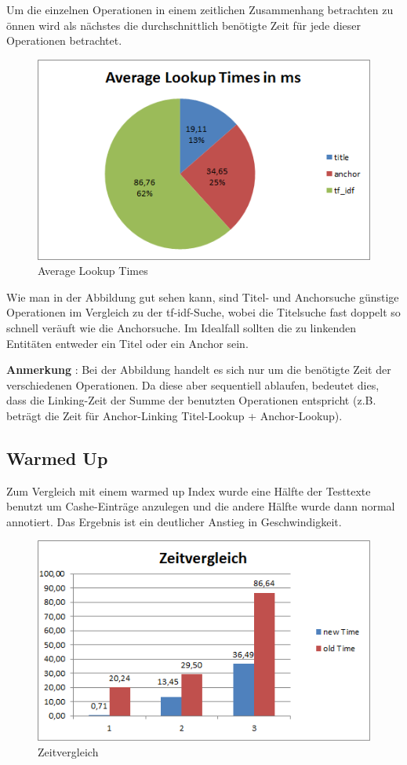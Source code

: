 \documentclass[11pt, a4paper, oneside]{Thesis} %
\begin{document}
Um die einzelnen Operationen in einem zeitlichen Zusammenhang betrachten zu \"onnen wird als n\"achstes die durchschnittlich ben\"otigte Zeit f\"ur jede dieser Operationen betrachtet. 
\begin{figure}[ht!]
\centering
\includegraphics[scale=1]{./lookupTime.png}
\caption[Average Lookup Times]{Average Lookup Times}
\end{figure}

Wie man in der Abbildung gut sehen kann, sind Titel- und Anchorsuche g\"unstige Operationen im Vergleich zu der tf-idf-Suche, wobei die Titelsuche fast doppelt so schnell ver\"auft wie die Anchorsuche. Im Idealfall sollten die zu linkenden Entit\"aten entweder ein Titel oder ein Anchor sein.

\textbf{Anmerkung} : Bei der Abbildung handelt es sich nur um die ben\"otigte Zeit der verschiedenen Operationen. Da diese aber sequentiell ablaufen, bedeutet dies, dass die Linking-Zeit der Summe der benutzten Operationen entspricht (z.B. betr\"agt die Zeit f\"ur Anchor-Linking Titel-Lookup + Anchor-Lookup).
\subsection{Warmed Up}
Zum Vergleich mit einem \grqq warmed up Index \grqq{} wurde eine H\"alfte der Testtexte benutzt um Cashe-Eintr\"age anzulegen und die andere H\"alfte wurde dann normal annotiert. Das Ergebnis ist ein deutlicher Anstieg in Geschwindigkeit.
\begin{figure}[ht!]
\centering
\includegraphics[scale=1]{./zeitvergleich.png}
\caption[Zeitvergleich warmed vs unarmed]{Zeitvergleich}
\end{figure}
\end{document}
